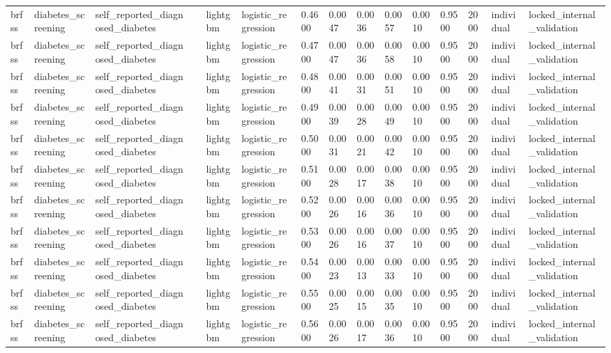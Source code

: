 \begin{tabular}{lllllllllllllll}
brfss & diabetes\_screening & self\_reported\_diagnosed\_diabetes &  & lightgbm & logistic\_regression & 0.4600 & 0.0047 & 0.0036 & 0.0057 & 0.0010 & 0.9500 & 2000 & individual & locked\_internal\_validation \\
brfss & diabetes\_screening & self\_reported\_diagnosed\_diabetes &  & lightgbm & logistic\_regression & 0.4700 & 0.0047 & 0.0036 & 0.0058 & 0.0010 & 0.9500 & 2000 & individual & locked\_internal\_validation \\
brfss & diabetes\_screening & self\_reported\_diagnosed\_diabetes &  & lightgbm & logistic\_regression & 0.4800 & 0.0041 & 0.0031 & 0.0051 & 0.0010 & 0.9500 & 2000 & individual & locked\_internal\_validation \\
brfss & diabetes\_screening & self\_reported\_diagnosed\_diabetes &  & lightgbm & logistic\_regression & 0.4900 & 0.0039 & 0.0028 & 0.0049 & 0.0010 & 0.9500 & 2000 & individual & locked\_internal\_validation \\
brfss & diabetes\_screening & self\_reported\_diagnosed\_diabetes &  & lightgbm & logistic\_regression & 0.5000 & 0.0031 & 0.0021 & 0.0042 & 0.0010 & 0.9500 & 2000 & individual & locked\_internal\_validation \\
brfss & diabetes\_screening & self\_reported\_diagnosed\_diabetes &  & lightgbm & logistic\_regression & 0.5100 & 0.0028 & 0.0017 & 0.0038 & 0.0010 & 0.9500 & 2000 & individual & locked\_internal\_validation \\
brfss & diabetes\_screening & self\_reported\_diagnosed\_diabetes &  & lightgbm & logistic\_regression & 0.5200 & 0.0026 & 0.0016 & 0.0036 & 0.0010 & 0.9500 & 2000 & individual & locked\_internal\_validation \\
brfss & diabetes\_screening & self\_reported\_diagnosed\_diabetes &  & lightgbm & logistic\_regression & 0.5300 & 0.0026 & 0.0016 & 0.0037 & 0.0010 & 0.9500 & 2000 & individual & locked\_internal\_validation \\
brfss & diabetes\_screening & self\_reported\_diagnosed\_diabetes &  & lightgbm & logistic\_regression & 0.5400 & 0.0023 & 0.0013 & 0.0033 & 0.0010 & 0.9500 & 2000 & individual & locked\_internal\_validation \\
brfss & diabetes\_screening & self\_reported\_diagnosed\_diabetes &  & lightgbm & logistic\_regression & 0.5500 & 0.0025 & 0.0015 & 0.0035 & 0.0010 & 0.9500 & 2000 & individual & locked\_internal\_validation \\
brfss & diabetes\_screening & self\_reported\_diagnosed\_diabetes &  & lightgbm & logistic\_regression & 0.5600 & 0.0026 & 0.0017 & 0.0036 & 0.0010 & 0.9500 & 2000 & individual & locked\_internal\_validation \\

\end{tabular}
